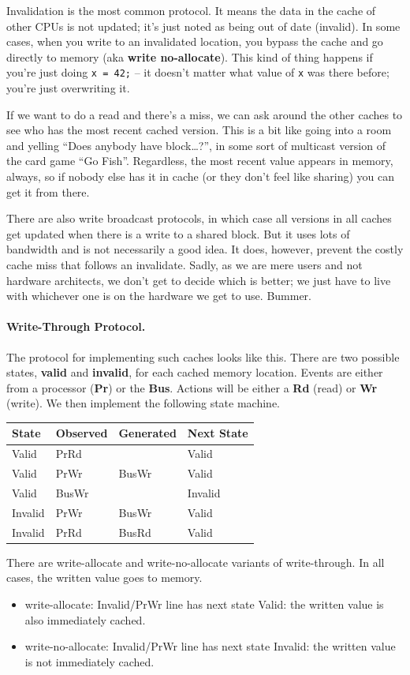 Invalidation is the most common protocol. It means the data in the cache of other CPUs is not updated; it's just noted as being out of date (invalid). In some cases, when you write to an invalidated location, you bypass the cache and go directly to memory (aka {\bf write no-allocate}). This kind of thing happens if you're just doing \texttt{x = 42;} -- it doesn't matter what value of \texttt{x} was there before; you're just overwriting it.

If we want to do a read and there's a miss, we can ask around the other caches to see who has the most recent cached version. This is a bit like going into a room and yelling ``Does anybody have block\ldots?'', in some sort of multicast version of the card game ``Go Fish''. Regardless, the most recent value appears in memory, always, so if nobody else has it in cache (or they don't feel like sharing) you can get it from there.

There are also write broadcast protocols, in which case all versions in all caches get updated when there is a write to a shared block. But it uses lots of bandwidth and is not necessarily a good idea. It does, however, prevent the costly cache miss that follows an invalidate. Sadly, as we are mere users and not hardware architects, we don't get to decide which is better; we just have to live with whichever one is on the hardware we get to use. Bummer.

\paragraph{Write-Through Protocol.}
The protocol for implementing such caches looks like this.
There are two possible states, {\bf valid} and {\bf invalid}, for each cached memory location.
Events are either from a processor ({\bf Pr}) or the {\bf Bus}. Actions will be either a \textbf{Rd} (read) or \textbf{Wr} (write).
We then implement the following state machine.

  \begin{center}
    \begin{tabular}{l|l|l|l}
      {\bf State} & {\bf Observed} & {\bf Generated} & {\bf Next State}\\ \hline
      Valid   & PrRd  &       & Valid\\
      Valid   & PrWr  & BusWr & Valid\\
      Valid   & BusWr &       & Invalid\\
      Invalid & PrWr  & BusWr & Valid\\
      Invalid & PrRd  & BusRd & Valid\\
    \end{tabular}
  \end{center}
There are write-allocate and write-no-allocate variants of write-through. In all cases, the written value goes to memory.
  \begin{itemize}[noitemsep]
  \item  write-allocate: Invalid/PrWr line has next state Valid: the written value is also immediately cached.
  \item  write-no-allocate: Invalid/PrWr line has next state Invalid: the written value is not immediately cached.
  \end{itemize}

